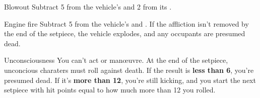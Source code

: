 
\begin{describe}{Blowout}
  Subtract 5 from the vehicle's  and 2 from its .
\end{describe}

\begin{describe}{Engine fire}
  Subtract 5 from the vehicle's  and . If the affliction isn't removed by the end of the setpiece, the vehicle explodes, and any occupants are presumed dead.
\end{describe}

\begin{describe}{Unconsciousness}
  You can't act or man\oe{}uvre. At the end of the setpiece, unconcious charaters must roll  against death. If the result is \textbf{less than 6}, you're presumed dead. If it's \textbf{more than 12}, you're still kicking, and you start the next setpiece with hit points equal to how much more than 12 you rolled.
\end{describe}
